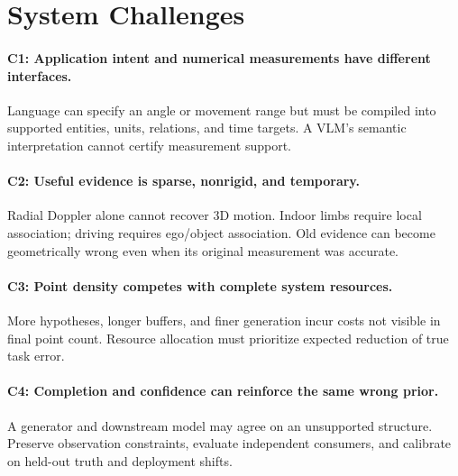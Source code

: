 \section{System Challenges}
\label{sec:challenges}
\paragraph{C1: Application intent and numerical measurements have different interfaces.}
Language can specify an angle or movement range but must be compiled into supported entities, units, relations, and time targets. A VLM's semantic interpretation cannot certify measurement support.

\paragraph{C2: Useful evidence is sparse, nonrigid, and temporary.}
Radial Doppler alone cannot recover 3D motion. Indoor limbs require local association; driving requires ego/object association. Old evidence can become geometrically wrong even when its original measurement was accurate.

\paragraph{C3: Point density competes with complete system resources.}
More hypotheses, longer buffers, and finer generation incur costs not visible in final point count. Resource allocation must prioritize expected reduction of true task error.

\paragraph{C4: Completion and confidence can reinforce the same wrong prior.}
A generator and downstream model may agree on an unsupported structure. Preserve observation constraints, evaluate independent consumers, and calibrate on held-out truth and deployment shifts.
